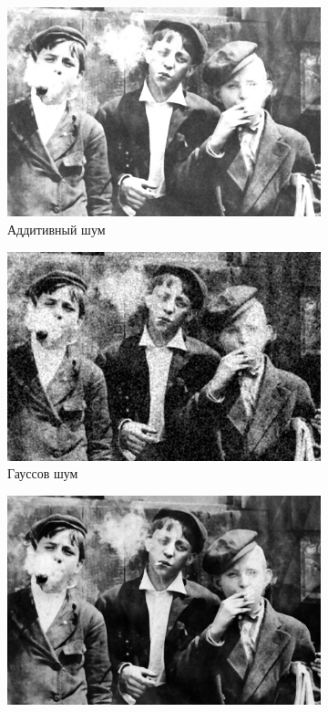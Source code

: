 \begin{figure}[ht]
\begin{subfigure}[b]{0.5\linewidth}
      \includegraphics[width=0.95\linewidth]{../Median_FIlter/Median_Additive_noise_(k=5).jpg} 
      \caption{Аддитивный шум} 
      \label{median_5:c} 
      \vspace{4ex}
    \end{subfigure}%
    \begin{subfigure}[b]{0.5\linewidth}
      \centering
      \includegraphics[width=0.95\linewidth]{../Median_FIlter/Median_Gaussian_noise_(k=5).jpg} 
      \caption{Гауссов шум} 
      \label{median_5:d} 
      \vspace{4ex}
    \end{subfigure}
    \begin{subfigure}[b]{0.5\linewidth}
      \centering
      \includegraphics[width=0.95\linewidth]{../Median_FIlter/Median_Poisson_noise_(k=5).jpg} 

\end{subfigure}
\end{figure}
